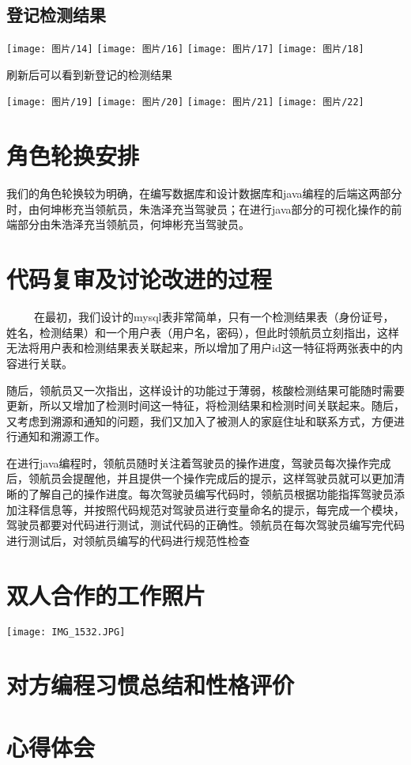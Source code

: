 \documentclass{article}
\begin{document}
\subsection{登记检测结果}
\begin{center}
\texttt{[image: 图片/14]}
\texttt{[image: 图片/16]}
\texttt{[image: 图片/17]}
\texttt{[image: 图片/18]}
\end{center}

刷新后可以看到新登记的检测结果

\begin{center}
\texttt{[image: 图片/19]}
\texttt{[image: 图片/20]}
\texttt{[image: 图片/21]}
\texttt{[image: 图片/22]}
\end{center}
\section{角色轮换安排}
我们的角色轮换较为明确，在编写数据库和设计数据库和java编程的后端这两部分时，由何坤彬充当领航员，朱浩泽充当驾驶员；在进行java部分的可视化操作的前端部分由朱浩泽充当领航员，何坤彬充当驾驶员。
\section{代码复审及讨论改进的过程}
\ \ \ \ \ 在最初，我们设计的mysql表非常简单，只有一个检测结果表（身份证号，姓名，检测结果）和一个用户表（用户名，密码），但此时领航员立刻指出，这样无法将用户表和检测结果表关联起来，所以增加了用户id这一特征将两张表中的内容进行关联。

随后，领航员又一次指出，这样设计的功能过于薄弱，核酸检测结果可能随时需要更新，所以又增加了检测时间这一特征，将检测结果和检测时间关联起来。随后，又考虑到溯源和通知的问题，我们又加入了被测人的家庭住址和联系方式，方便进行通知和溯源工作。

在进行java编程时，领航员随时关注着驾驶员的操作进度，驾驶员每次操作完成后，领航员会提醒他，并且提供一个操作完成后的提示，这样驾驶员就可以更加清晰的了解自己的操作进度。每次驾驶员编写代码时，领航员根据功能指挥驾驶员添加注释信息等，并按照代码规范对驾驶员进行变量命名的提示，每完成一个模块，驾驶员都要对代码进行测试，测试代码的正确性。领航员在每次驾驶员编写完代码进行测试后，对领航员编写的代码进行规范性检查





\section{双人合作的工作照片}
\centerline{\texttt{[image: IMG\_1532.JPG]}}
\section{对方编程习惯总结和性格评价}
\section{心得体会}
\end{document}

